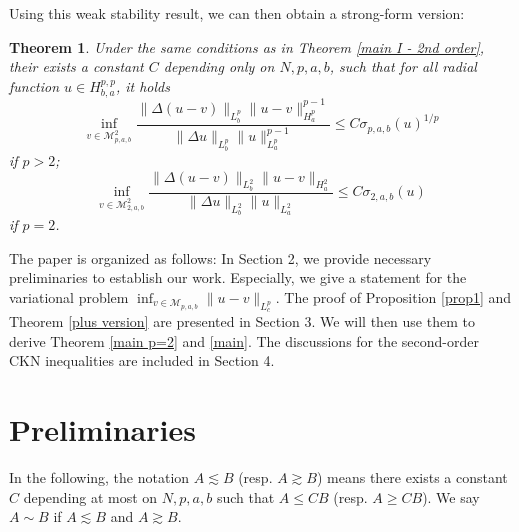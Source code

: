 \documentclass[11pt]{article}
\newtheorem{theorem}{Theorem}[section]
\numberwithin{equation}{section}
\begin{document}
Using this weak stability result, we can then obtain a strong-form version:
\begin{theorem}\label{main II - 2nd order}
    Under the same conditions as in Theorem \ref{main I - 2nd order}, their exists a constant $C$ depending only on $N,p,a,b$, such that for all radial function $u\in H_{b,a}^{p,p}$, it holds
    \begin{equation}\label{2nd strong inequalities}
        \inf_{v\in\mathcal{M}_{p,a,b}^2}\frac{\|\Delta(u-v)\|_{L_b^p}\|u-v\|_{H_a^p}^{p-1}}{\|\Delta u\|_{L_b^p}\|u\|_{L^p_a}^{p-1}} \le C \sigma_{p,a,b}(u)^{1/p}
    \end{equation}
    if $p>2$;
    \begin{equation}\label{2nd strong inequalities p=2}
        \inf_{v\in\mathcal{M}_{2,a,b}^2}\frac{\|\Delta(u-v)\|_{L_b^2}\|u-v\|_{H_a^2}}{\|\Delta u\|_{L_b^2}\|u\|_{L^2_a}} \le C \sigma_{2,a,b}(u)
    \end{equation}
    if $p=2$.
\end{theorem}


\vskip0.2in


The paper is organized as follows: In Section 2, we provide necessary preliminaries to establish our work. Especially, we give a statement for the variational problem $\inf_{v\in\mathcal{M}_{p,a,b}}\|u-v\|_{L^p_c}$. The proof of Proposition \ref{prop1} and Theorem \ref{plus version} are presented in Section 3. We will then use them to derive Theorem \ref{main p=2} and \ref{main}. The discussions for the second-order CKN inequalities are included in Section 4.

\section{Preliminaries}\label{section 2}

In the following, the notation $A\lesssim B$ (resp. $A\gtrsim B$) means there exists a constant $C$ depending at most on $N,p,a,b$ such that $A\le CB$ (resp. $A\ge CB$). We say $A\sim B$ if $A\lesssim B$ and $A\gtrsim B$.
\end{document}

